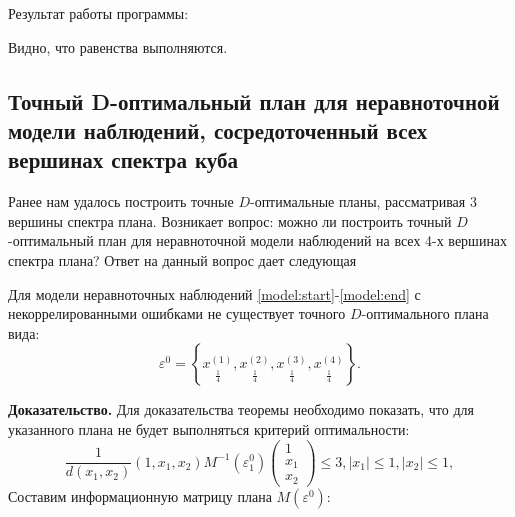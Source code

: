	Результат работы программы:
	
	
	Видно, что равенства выполняются.
	
\subsection {Точный D-оптимальный план для неравноточной модели наблюдений, сосредоточенный всех вершинах спектра куба}
	Ранее нам удалось построить точные $D$-оптимальные планы, рассматривая 3 вершины спектра плана. Возникает вопрос: можно ли построить точный $D$-оптимальный план для неравноточной модели наблюдений на всех 4-х вершинах спектра плана? Ответ на данный вопрос дает следующая
	\begin{theorem} \label{theorem-4p}
		Для модели неравноточных наблюдений \eqref{model:start}-\eqref{model:end} с некоррелированными ошибками
		не существует точного $D$-оптимального плана вида:
		\begin{equation}
			\varepsilon^{0} = \left \{
				\underset{\frac 1 4} {x^{(1)}},
				\underset{\frac 1 4} {x^{(2)}},
				\underset{\frac 1 4} {x^{(3)}},
				\underset{\frac 1 4} {x^{(4)}}
			\right \}.
		\end{equation}	 
	\end{theorem}
	\textbf{Доказательство.}
	Для доказательства теоремы необходимо показать, что для указанного плана не будет выполняться критерий оптимальности:
	\begin{equation}\label{theorem-4p:criterion}
		\frac 1 {d(x_1, x_2)}
			(1, x_1, x_2)
			M^{-1}(\varepsilon_1^0)
			\begin{pmatrix}1 \\ x_1 \\ x_2 \end{pmatrix} \le 3,
			|x_1| \le 1, |x_2| \le 1,
	\end{equation}
	Составим информационную матрицу плана $M(\varepsilon^0)$:
